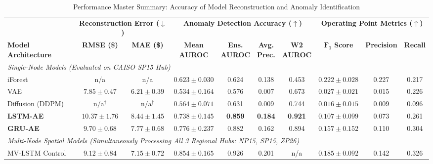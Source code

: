 \documentclass[journal]{IEEEtran}
\begin{document}
\begin{table}[!t]
    \centering
    \caption{Performance Master Summary: Accuracy of Model Reconstruction and Anomaly Identification}
    \label{tab:detector_results}
    \footnotesize
    \renewcommand{\arraystretch}{1.2}
    \setlength{\tabcolsep}{3.5pt}
    \begin{tabular*}{\textwidth}{@{\extracolsep{\fill}}lccccccccc@{}}
    \toprule
    & \multicolumn{2}{c}{\textbf{Reconstruction Error ($\downarrow$)}} & \multicolumn{4}{c}{\textbf{Anomaly Detection Accuracy ($\uparrow$)}} & \multicolumn{3}{c}{\textbf{Operating Point Metrics ($\uparrow$)}} \\
    \cmidrule(lr){2-3} \cmidrule(lr){4-7} \cmidrule(lr){8-10}
    \textbf{Model Architecture} & \textbf{RMSE (\$)} & \textbf{MAE (\$)} & \shortstack{\textbf{Mean}\\\textbf{AUROC}} & \shortstack{\textbf{Ens.}\\\textbf{AUROC}} & \shortstack{\textbf{Avg.}\\\textbf{Prec.}} & \shortstack{\textbf{W2}\\\textbf{AUROC}} & \shortstack{$\boldsymbol{F_1}$\\\textbf{Score}} & \textbf{Precision} & \textbf{Recall} \\
    \midrule
    \multicolumn{10}{l}{\emph{Single-Node Models (Evaluated on CAISO SP15 Hub)}} \\
    iForest & n/a & n/a & $0.623\pm0.030$ & 0.624 & 0.138 & 0.453 & $0.222\pm0.028$ & 0.227 & 0.217 \\
    VAE & $7.85\pm0.47$ & $6.21\pm0.39$ & $0.534\pm0.164$ & 0.576 & 0.007 & 0.673 & $0.027\pm0.021$ & 0.015 & 0.226 \\
    Diffusion (DDPM) & n/a$^\dagger$ & n/a$^\dagger$ & $0.564\pm0.071$ & 0.631 & 0.009 & 0.744 & $0.016\pm0.015$ & 0.009 & 0.096 \\
    \textbf{LSTM-AE} & $10.37\pm1.76$ & $8.44\pm1.45$ & $\mathbf{0.738\pm0.145}$ & \textbf{0.859} & \textbf{0.184} & \textbf{0.921} & $0.107\pm0.099$ & 0.073 & 0.261 \\
    \textbf{GRU-AE} & $9.70\pm0.68$ & $7.77\pm0.68$ & $0.776\pm0.237$ & 0.882 & 0.162 & 0.894 & $0.157\pm0.152$ & 0.110 & 0.304 \\
    \midrule
    \multicolumn{10}{l}{\emph{Multi-Node Spatial Models (Simultaneously Processing All 3 Regional Hubs: NP15, SP15, ZP26)}} \\
    MV-LSTM Control & $9.12\pm0.84$ & $7.15\pm0.72$ & $0.854\pm0.165$ & 0.926 & 0.201 & n/a & $0.185\pm0.092$ & 0.142 & 0.326 \\

\end{tabular*}
\end{table}
\end{document}
